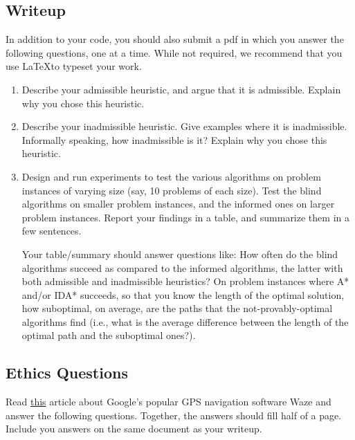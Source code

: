 \documentclass{article}
\begin{document}
\subsection{Writeup}

In addition to your code, you should also submit a pdf in which you
answer the following questions, one at a time.  While not required, we
recommend that you use \LaTeX to typeset your work.

\begin{enumerate}

\item Describe your admissible heuristic, and argue that it is admissible.
  Explain why you chose this heuristic.

\item Describe your inadmissible heuristic. Give examples where it is
  inadmissible.  Informally speaking, how inadmissible is it?
  Explain why you chose this heuristic.

\item Design and run experiments to test the various algorithms on
  problem instances of varying size (say, 10 problems of each size).
  Test the blind algorithms on smaller problem instances, and the
  informed ones on larger problem instances.  Report your findings in
  a table, and summarize them in a few sentences.

  Your table/summary should answer questions like: How often do the
  blind algorithms succeed as compared to the informed algorithms, the
  latter with both admissible and inadmissible heuristics?  On problem
  instances where A* and/or IDA* succeeds, so that you know the length
  of the optimal solution, how suboptimal, on average, are the paths
  that the not-provably-optimal algorithms find (i.e., what is the
  average difference between the length of the optimal path and the
  suboptimal ones?).

\end{enumerate}

\subsection{Ethics Questions}
Read \href{https://www.usnews.com/news/national-news/articles/2018-05-07/why-some-cities-have-had-enough-of-waze}{this} article about Google's popular GPS navigation software Waze and answer the following questions. Together, the answers should fill half of a page. Include you answers on the same document as your writeup.
\end{document}
